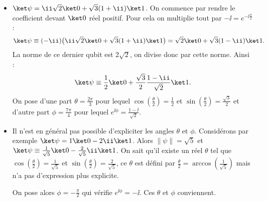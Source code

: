 \documentclass[11pt,class=report,crop=false]{standalone}
\begin{document}
\begin{exemple}
\sauteligne
\begin{itemize}
  \item $\ket\psi = \ii\sqrt2\ket0 + \sqrt3(1+\ii)\ket1$.
  On commence par rendre le coefficient devant $\ket0$ réel positif. Pour cela on multiplie tout par $-\ii = e^{-\ii\frac\pi2}$ :
  $$\ket\psi \equiv (-\ii)\big(\ii\sqrt2\ket0 + \sqrt3(1+\ii)\ket1\big)
  = \sqrt2\ket0 + \sqrt3(1-\ii)\ket1.$$
  La norme de ce dernier qubit est $2\sqrt2$, on divise donc par cette norme. Ainsi :
  $$\ket\psi \equiv \frac12\ket0 + \frac{\sqrt3}{2} \frac{1-\ii}{\sqrt2}\ket1.$$
  On pose d'une part $\theta=\frac{2\pi}3$ pour lequel $\cos\left(\frac\theta2\right)=\frac12$ et $\sin\left(\frac\theta2\right)= \frac{\sqrt3}{2}$ et d'autre part $\phi=\frac{7\pi}{4}$ pour lequel
  $e^{\ii\phi} = \frac{1-\ii}{\sqrt2}$.
  
 
  \item Il n'est en général pas possible d'expliciter les angles $\theta$ et $\phi$.
  Considérons par exemple $\ket\psi = 1\ket0 - 2\ii\ket1$.
  Alors $\|\psi\| = \sqrt5$ et
  $\ket\psi \equiv \frac{1}{\sqrt5}\ket0 -\frac{2}{\sqrt5}\ii\ket1$.
  On sait qu'il existe un réel $\theta$ tel que $\cos\left(\frac\theta2\right) = \frac{1}{\sqrt5}$
  et $\sin\left(\frac\theta2\right) = \frac{2}{\sqrt5}$, ce $\theta$ est défini par 
  $\frac\theta2 = \operatorname{arccos}(\frac{1}{\sqrt5})$ mais n'a pas d'expression plus explicite.
  
  On pose alors $\phi = -\frac\pi2$ qui vérifie $e^{\ii\phi} = -\ii$.
  Ces $\theta$ et $\phi$ conviennent.
  
\end{itemize} 
\end{exemple}
\end{document}
